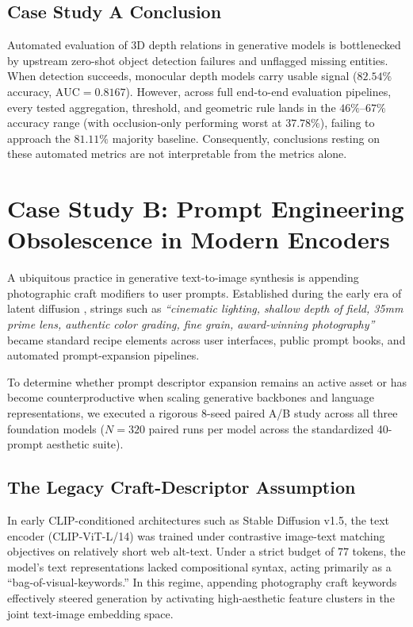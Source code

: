 \documentclass[10pt,twocolumn,letterpaper]{article}
\begin{document}
\subsection{Case Study A Conclusion}
Automated evaluation of 3D depth relations in generative models is bottlenecked by upstream zero-shot object detection failures and unflagged missing entities. When detection succeeds, monocular depth models carry usable signal ($82.54\%$ accuracy, $\text{AUC} = 0.8167$). However, across full end-to-end evaluation pipelines, every tested aggregation, threshold, and geometric rule lands in the $46\%\text{--}67\%$ accuracy range (with occlusion-only performing worst at $37.78\%$), failing to approach the $81.11\%$ majority baseline. Consequently, conclusions resting on these automated metrics are not interpretable from the metrics alone.

\section{Case Study B: Prompt Engineering Obsolescence in Modern Encoders}

A ubiquitous practice in generative text-to-image synthesis is appending photographic craft modifiers to user prompts. Established during the early era of latent diffusion \citep{rombach2022high}, strings such as \textit{``cinematic lighting, shallow depth of field, 35mm prime lens, authentic color grading, fine grain, award-winning photography''} became standard recipe elements across user interfaces, public prompt books, and automated prompt-expansion pipelines.

To determine whether prompt descriptor expansion remains an active asset or has become counterproductive when scaling generative backbones and language representations, we executed a rigorous 8-seed paired A/B study across all three foundation models ($N = 320$ paired runs per model across the standardized 40-prompt aesthetic suite).

\subsection{The Legacy Craft-Descriptor Assumption}
In early CLIP-conditioned architectures such as Stable Diffusion v1.5, the text encoder (CLIP-ViT-L/14) was trained under contrastive image-text matching objectives on relatively short web alt-text. Under a strict budget of $77$ tokens, the model's text representations lacked compositional syntax, acting primarily as a ``bag-of-visual-keywords.'' In this regime, appending photography craft keywords effectively steered generation by activating high-aesthetic feature clusters in the joint text-image embedding space. 
\end{document}
